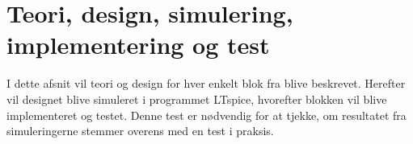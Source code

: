 \section{Teori, design, simulering, implementering og test }
I dette afsnit vil teori og design for hver enkelt blok fra  blive beskrevet. Herefter vil designet blive simuleret i programmet LTspice, hvorefter blokken vil blive implementeret og testet. Denne test er nødvendig for at tjekke, om resultatet fra simuleringerne stemmer overens med en test i praksis. %